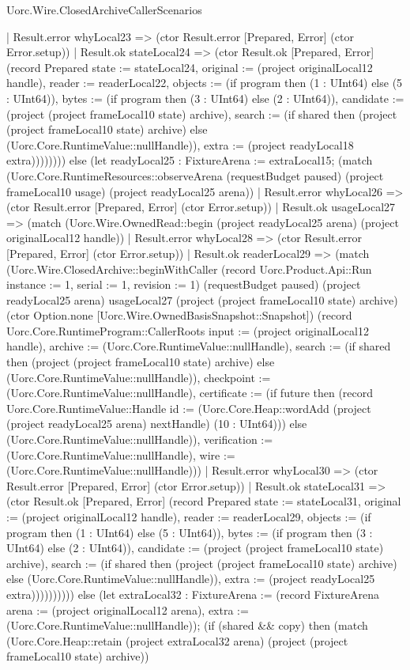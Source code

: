 \begin{lexlean}{Uorc.Wire.ClosedArchiveCallerScenarios}
\begin{semanticmodule}
{                  | Result.error whyLocal23 => (ctor Result.error [Prepared, Error] (ctor Error.setup))
                  | Result.ok stateLocal24 => (ctor Result.ok [Prepared, Error] (record Prepared {state := stateLocal24, original := (project originalLocal12 handle), reader := readerLocal22, objects := (if program then (1 : UInt64) else (5 : UInt64)), bytes := (if program then (3 : UInt64) else (2 : UInt64)), candidate := (project (project frameLocal10 state) archive), search := (if shared then (project (project frameLocal10 state) archive) else (Uorc.Core.RuntimeValue::nullHandle)), extra := (project readyLocal18 extra)}))))))) else (let readyLocal25 : FixtureArena := extraLocal15; (match (Uorc.Core.RuntimeResources::observeArena (requestBudget paused) (project frameLocal10 usage) (project readyLocal25 arena))
            | Result.error whyLocal26 => (ctor Result.error [Prepared, Error] (ctor Error.setup))
            | Result.ok usageLocal27 => (match (Uorc.Wire.OwnedRead::begin (project readyLocal25 arena) (project originalLocal12 handle))
              | Result.error whyLocal28 => (ctor Result.error [Prepared, Error] (ctor Error.setup))
              | Result.ok readerLocal29 => (match (Uorc.Wire.ClosedArchive::beginWithCaller (record Uorc.Product.Api::Run {instance := 1, serial := 1, revision := 1}) (requestBudget paused) (project readyLocal25 arena) usageLocal27 (project (project frameLocal10 state) archive) (ctor Option.none [Uorc.Wire.OwnedBasisSnapshot::Snapshot]) (record Uorc.Core.RuntimeProgram::CallerRoots {input := (project originalLocal12 handle), archive := (Uorc.Core.RuntimeValue::nullHandle), search := (if shared then (project (project frameLocal10 state) archive) else (Uorc.Core.RuntimeValue::nullHandle)), checkpoint := (Uorc.Core.RuntimeValue::nullHandle), certificate := (if future then (record Uorc.Core.RuntimeValue::Handle {id := (Uorc.Core.Heap::wordAdd (project (project readyLocal25 arena) nextHandle) (10 : UInt64))}) else (Uorc.Core.RuntimeValue::nullHandle)), verification := (Uorc.Core.RuntimeValue::nullHandle), wire := (Uorc.Core.RuntimeValue::nullHandle)}))
                | Result.error whyLocal30 => (ctor Result.error [Prepared, Error] (ctor Error.setup))
                | Result.ok stateLocal31 => (ctor Result.ok [Prepared, Error] (record Prepared {state := stateLocal31, original := (project originalLocal12 handle), reader := readerLocal29, objects := (if program then (1 : UInt64) else (5 : UInt64)), bytes := (if program then (3 : UInt64) else (2 : UInt64)), candidate := (project (project frameLocal10 state) archive), search := (if shared then (project (project frameLocal10 state) archive) else (Uorc.Core.RuntimeValue::nullHandle)), extra := (project readyLocal25 extra)}))))))))) else (let extraLocal32 : FixtureArena := (record FixtureArena {arena := (project originalLocal12 arena), extra := (Uorc.Core.RuntimeValue::nullHandle)}); (if (shared && copy) then (match (Uorc.Core.Heap::retain (project extraLocal32 arena) (project (project frameLocal10 state) archive))
}
\end{semanticmodule}
\end{lexlean}
